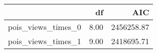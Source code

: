 \begin{table}[ht]
\centering
\begin{tabular}{rrr}
  \hline
 & df & AIC \\ 
  \hline
pois\_views\_times\_0 & 8.00 & 2456258.87 \\ 
  pois\_views\_times\_1 & 9.00 & 2418695.71 \\ 
   \hline
\end{tabular}
\end{table}
